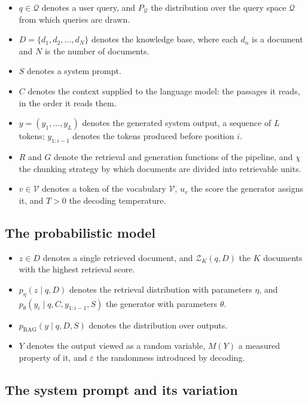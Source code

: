 \documentclass[12pt,a4paper,oneside]{scrreprt}
\begin{document}
\begin{itemize}
    \item $q \in \mathcal{Q}$ denotes a user query, and $P_{\mathcal{Q}}$ the distribution over the query space $\mathcal{Q}$ from which queries are drawn.
    \item $D = \{d_1, d_2, \ldots, d_N\}$ denotes the knowledge base, where each $d_n$ is a document and $N$ is the number of documents.
    \item $S$ denotes a system prompt.
    \item $C$ denotes the context supplied to the language model: the passages it reads, in the order it reads them.
    \item $y = (y_1,\ldots,y_L)$ denotes the generated system output, a sequence of $L$ tokens; $y_{1:i-1}$ denotes the tokens produced before position $i$.
    \item $R$ and $G$ denote the retrieval and generation functions of the pipeline, and $\chi$ the chunking strategy by which documents are divided into retrievable units.
    \item $v \in \mathcal{V}$ denotes a token of the vocabulary $\mathcal{V}$, $u_v$ the score the generator assigns it, and $T > 0$ the decoding temperature.
\end{itemize}

\subsection*{The probabilistic model}

\begin{itemize}
    \item $z \in D$ denotes a single retrieved document, and $\mathcal{Z}_K(q,D)$ the $K$ documents with the highest retrieval score.
    \item $p_\eta(z \mid q,D)$ denotes the retrieval distribution with parameters $\eta$, and $p_\theta(y_i \mid q,C,y_{1:i-1},S)$ the generator with parameters $\theta$.
    \item $p_{\mathrm{RAG}}(y \mid q,D,S)$ denotes the distribution over outputs.
    \item $Y$ denotes the output viewed as a random variable, $M(Y)$ a measured property of it, and $\varepsilon$ the randomness introduced by decoding.
\end{itemize}

\subsection*{The system prompt and its variation}
\end{document}
